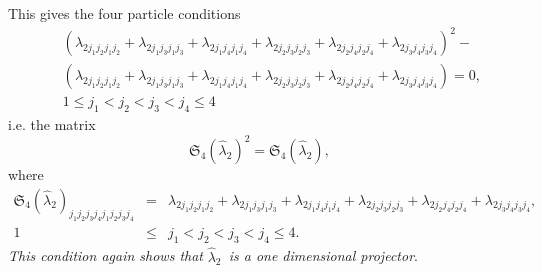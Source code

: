 \documentclass[12pt]{article}
\begin{document}
This gives the four particle conditions%
\begin{eqnarray*}
&&\left( \lambda _{2j_{1}j_{2}j_{1}j_{2}}+\lambda
_{2j_{1}j_{3}j_{1}j_{3}}+\lambda _{2j_{1}j_{4}j_{1}j_{4}}+\lambda
_{2j_{2}j_{3}j_{2}j_{3}}+\lambda _{2j_{2}j_{4}j_{2}j_{4}}+\lambda
_{2j_{3}j_{4}j_{3}j_{4}}\right) ^{2}- \\
&&\left( \lambda _{2j_{1}j_{2}j_{1}j_{2}}+\lambda
_{2j_{1}j_{3}j_{1}j_{3}}+\lambda _{2j_{1}j_{4}j_{1}j_{4}}+\lambda
_{2j_{2}j_{3}j_{2}j_{3}}+\lambda _{2j_{2}j_{4}j_{2}j_{4}}+\lambda
_{2j_{3}j_{4}j_{3}j_{4}}\right) =0, \\
\, &&1\leq j_{1}<j_{2}<j_{3}<j_{4}\leq 4
\end{eqnarray*}%
i.e. the matrix 
\begin{equation*}
\mathfrak{S}_{4}\left( \hat{\lambda}_{2}\right) ^{2}=\mathfrak{S}_{4}\left( 
\hat{\lambda}_{2}\right) ,
\end{equation*}%
where 
\begin{eqnarray*}
\mathfrak{S}_{4}\left( \hat{\lambda}_{2}\right)
_{j_{1}j_{2}j_{3}j_{4}j_{1}j_{2}j_{3}j_{4}} &=&\lambda
_{2j_{1}j_{2}j_{1}j_{2}}+\lambda _{2j_{1}j_{3}j_{1}j_{3}}+\lambda
_{2j_{1}j_{4}j_{1}j_{4}}+\lambda _{2j_{2}j_{3}j_{2}j_{3}}+\lambda
_{2j_{2}j_{4}j_{2}j_{4}}+\lambda _{2j_{3}j_{4}j_{3}j_{4}},\, \\
1 &\leq &j_{1}<j_{2}<j_{3}<j_{4}\leq 4.
\end{eqnarray*}%
\emph{This condition again shows that }$\hat{\lambda}_{2}$\emph{\ is a one
dimensional projector}.
\end{document}
